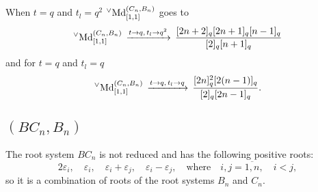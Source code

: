 \documentclass{article}
\def\MDv{{^\vee\hbox{Md}}}
\begin{document}
 When $t=q$ and $t_l=q^2$ $ \MDv_{[1,1]}^{(C_n,B_n)}$ goes to
\begin{equation}
    \MDv_{[1,1]}^{(C_n,B_n)}\,\xrightarrow[]{t\rightarrow q,\, t_l \rightarrow q^2} \, \frac{[2n+2]_q[2n+1]_q[n-1]_q}{[2]_q[n+1]_q}
\end{equation}
and for $t=q$ and $t_l=q$
 \begin{equation}
    \MDv_{[1,1]}^{(C_n,B_n)} \,\xrightarrow[]{t\rightarrow q,\, t_l \rightarrow q} \, \frac{[2n]^2_q[2(n-1)]_q}{[2]_q[2n-1]_q}.
\end{equation}

\subsection{$(BC_n, B_n)$}
The root system $BC_n$ is not reduced and has the following positive roots:
\begin{equation}
        2\varepsilon_i, \quad \varepsilon_i, \quad \varepsilon_i+\varepsilon_j, \quad \varepsilon_i-\varepsilon_j, \quad \text{where}\quad i,j = \overline{1,n}, \quad i<j,
\end{equation}
so it is a combination of roots of the root systems $B_n$ and $C_n$.
\end{document}
